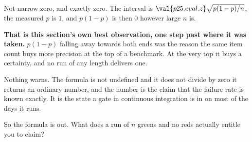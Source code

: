 \begin{fr}

Not narrow \dash{} zero, and exactly zero. The interval is
$\val{p25.eval.z}\sqrt{p(1-p)/n}$, the measured $p$ is $1$, and $p(1-p)$ is
then $0$ however large $n$ is.

\textbf{That is this section's own best observation, one step past where it
was taken.} $p(1-p)$ falling away towards both ends was the reason the same
item count buys more precision at the top of a benchmark. At
the very top it buys a certainty, and no run of any length delivers one.

Nothing warns. The formula is not undefined and it does not divide by zero
\dash{} it returns an ordinary number, and the number is the claim that the
failure rate is known exactly. It is the state a gate in continuous
integration is in on most of the days it runs.

So the formula is out. What does a run of $n$ greens and no reds actually
entitle you to claim?
\dotline
\nextframe
\end{fr}

